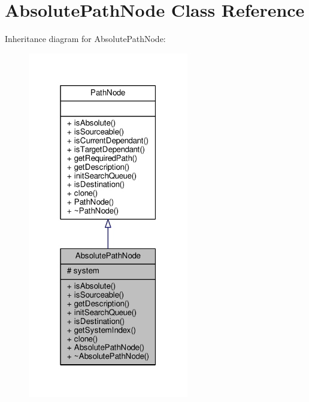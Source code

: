 \hypertarget{classAbsolutePathNode}{}\section{Absolute\+Path\+Node Class Reference}
\label{classAbsolutePathNode}


Inheritance diagram for Absolute\+Path\+Node\+:
\nopagebreak
\begin{figure}[H]
\begin{center}
\leavevmode
\includegraphics[width=199pt]{d1/dca/classAbsolutePathNode__inherit__graph}
\end{center}
\end{figure}


